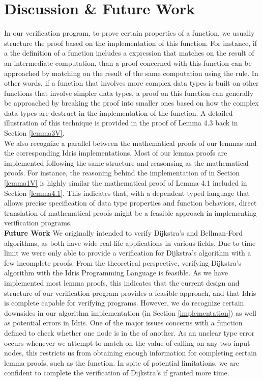 \section{Discussion \& Future Work} \label{discussion}
In our verification program, to prove certain properties of a function, we usually structure the proof based on the implementation of this function. For instance, if a the definition of a function includes a  expression that matches on the result of an intermediate computation, than a proof concerned with this function can be approached by matching on the result of the same computation using the  rule. In other words, if a function that involves more complex data types is built on other functions that involve simpler data types, a proof on this function can generally be approached by breaking the proof into smaller ones based on how the complex data types are destruct in the implementation of the function. A detailed illustration of this technique is provided in the proof of Lemma 4.3 back in Section \ref{lemma3V}.
\\

We also recognize a parallel between the mathematical proofs of our lemmas and the corresponding Idris implementations. Most of our lemma proofs are implemented following the same structure and reasonsing as the mathematical proofs. For instance, the reasoning behind the implementation of  in Section \ref{lemma1V} is highly similar the mathematical proof of Lemma 4.1 included in Section \ref{lemma4.1}. This indicates that, with a dependent typed language that allows precise specification of data type properties and function behaviors, direct translation of mathematical proofs might be a feasible approach in implementing verification programs.   
\\

\textbf{Future Work} We originally intended to verify Dijkstra's and Bellman-Ford algorithms, as both have wide real-life applications in various fields. Due to time limit we were only able to provide a verification for Dijkstra's algorithm with a few incomplete proofs. From the theoretical perspective, verifying Dijkstra's algorithm with the Idris Programming Language is feasible. As we have implemented most lemma proofs, this indicates that the current design and structure of our verification program provides a feasible approach, and that Idris is complete capable for verifying programs. However, we do recognize certain downsides in our algorithm implementation (in Section \ref{implementation}) as well as potential errors in Idris. One of the major issues concerns with a  function defined to check whether one node is in the  of another. As an unclear type error occurs whenever we attempt to match on the value of calling  on any two input nodes, this restricts us from obtaining enough information for completing certain lemma proofs, such as the  function. In spite of potential limitations, we are confident to complete the verification of Dijkstra's if granted more time. 

